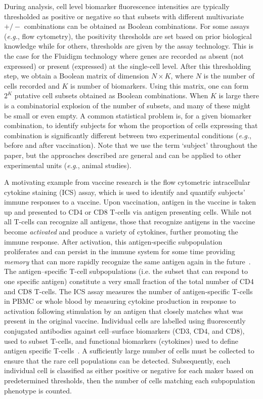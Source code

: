 \documentclass[12pt,oupdraft]{biostatistics}
\begin{document}
During analysis, cell level biomarker fluorescence intensities are typically thresholded as positive or negative so that subsets with different multivariate $+/-$ combinations can be obtained as Boolean combinations.
For some assays (\textit{e.g.}, flow cytometry), the positivity thresholds are set based on prior biological knowledge while for others, thresholds are given by the assay technology.
This is the case for the Fluidigm technology where genes are recorded as absent (not expressed) or present (expressed) at the single-cell level.
 After this thresholding step, we obtain a Boolean matrix of dimension $N\times K$, where $N$ is the number of cells recorded and $K$ is number of biomarkers.
Using this matrix, one can form $2^K$ putative cell subsets obtained as Boolean combinations.
When $K$ is large there is a combinatorial explosion of the number of subsets, and many of these might be small or even empty.
A common statistical problem is, for a given biomarker combination, to identify subjects for whom the proportion of cells expressing that combination is significantly different between two experimental conditions (\textit{e.g.}, before and after vaccination). Note that we use the term `subject' throughout the paper, but the approaches described are general and can be applied to other experimental units (\textit{e.g.}, animal studies).

A motivating example from vaccine research is the flow cytometric intracellular cytokine staining (ICS) assay, which is used to identify and quantify subjects' immune responses to a vaccine. Upon vaccination, antigen in the vaccine is taken up and presented to CD4 or CD8 T-cells via antigen presenting cells.
 While not all T-cells can recognize all antigens, those that recognize antigens in the vaccine become \emph{activated} and produce a variety of cytokines, further promoting the immune response.
 After activation, this antigen-specific subpopulation proliferates and can persist in the immune system for some time providing \emph{memory} that can more rapidly recognize the same antigen again in the future~\citep{McKinstry:2010ei}. The antigen--specific T-cell subpopulations (i.e. the subset that can respond to one specific antigen) constitute a very small fraction of the total number of CD4 and CD8 T-cells. The ICS assay measures the number of antigen-specific T-cells in PBMC or whole blood by measuring cytokine production in response to activation following stimulation by an antigen that closely matches what was present in the original vaccine.
Individual cells are labelled using fluorescently conjugated antibodies against cell--surface biomarkers (CD3, CD4, and CD8), used to subset T-cells, and functional biomarkers (cytokines) used to define antigen specific T-cells~\citep{Horton:2007tsa,DeRosa:2004wp,Betts:2006dw}.
A sufficiently large number of cells must be collected to ensure that the rare cell populations can be detected.
Subsequently, each individual cell is classified as either positive or negative for each maker based on predetermined thresholds, then the number of cells matching each subpopulation phenotype is counted.
\end{document}
